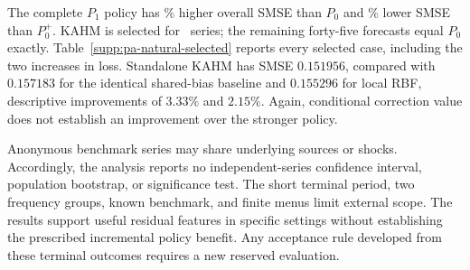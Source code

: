 \begin{table}[t]
\centering\small
\caption{Natural-panel policy SMSE and descriptive absolute-error scores.
Horizons are averaged within series,
the twenty-four series within each frequency are equally weighted, and
the overall result weights the two frequencies equally. All natural
comparisons are descriptive. Frequency MASE uses A-only lags $1/24$ and
seasonal MASE lags $52/24$ for Weekly/Hourly series, as specified in
Appendix~\ref{app:policy-augmentation}.}
\label{supp:pa-natural}

\end{table}

The complete $P_1$ policy has \PANaturalPenalty\% higher overall SMSE
than $P_0$ and \PANaturalGainExtra\% lower SMSE than $P_0^+$. KAHM is
selected for \PANaturalSelections\ series; the remaining forty-five
forecasts equal $P_0$ exactly. Table~\ref{supp:pa-natural-selected}
reports every selected case, including the two increases in loss.
Standalone KAHM has SMSE $0.151956$, compared with $0.157183$ for the
identical shared-bias baseline and $0.155296$ for local RBF, descriptive
improvements of $3.33\%$ and $2.15\%$. Again, conditional correction
value does not establish an improvement over the stronger policy.

\begin{table}[t]
\centering\small
\caption{All natural series for which C selects KAHM in $P_1$.
Positive percentage gains favor $P_1$. The subset is determined before
D scoring and remains descriptive; it is not a new superiority claim.}
\label{supp:pa-natural-selected}

\end{table}

Anonymous benchmark series may share underlying sources or shocks.
Accordingly, the analysis reports no independent-series confidence
interval, population bootstrap, or significance test. The short terminal
period, two frequency groups, known benchmark, and finite menus limit
external scope. The results support useful residual features in specific
settings without establishing the prescribed incremental policy benefit.
Any acceptance rule developed from these terminal outcomes requires a
new reserved evaluation.
